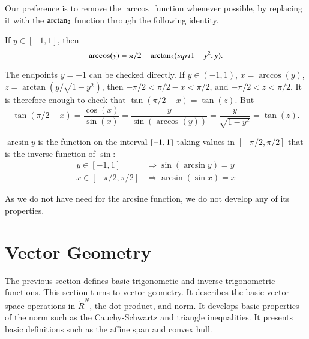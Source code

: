 Our preference is to remove the $\arccos$ function whenever
possible, by replacing it with the ${\operatorname{arctan_2}}$ function through the
following identity.  


\begin{lemma}\label{lemma:arccos-arctan}  
If $y\in [-1,1]$, then
    $$\arccos(y) = \pi/2 - {\operatorname{arctan_2}}({ sqrt{1-y^2}},{y}).$$
\end{lemma}

\begin{proved}
The endpoints $y=\pm1$ can be checked directly.
If $y\in (-1,1)$,  $x = \arccos(y)$, 
$z = \arctan(y/\sqrt{1-y^2})$, then
    $-\pi/2 < \pi/2 - x < \pi/2$, and $-\pi/2 < z < \pi/2$.  It is
    therefore enough to check that
        $\tan(\pi/2 - x) = \tan(z)$.
    But
        $$\tan(\pi/2-x) = \frac{\cos(x)}{\sin(x)} = \frac{y}{
        \sin(\arccos(y))} = \frac{y}{ \sqrt{1-y^2}} = \tan(z).$$
\swallowed\end{proved}

\begin{definition}[arcsine]\label{def:arcsin}
$\arcsin y$ is the function on the interval $[
-1,1]$ taking values in $[-\pi/2,\pi/2]$ that is the
inverse function of $\sin$:
    $$\begin{array}{lll}
        y\in [-1,1] &\Rightarrow \sin(\arcsin y) = y\\
        x\in[-\pi/2,\pi/2] &\Rightarrow \arcsin(\sin x) = x
    \end{array}$$
\end{definition}

As we do not have need for the arcsine function, we do not develop
any of its properties.





\section{Vector Geometry}

The previous section defines basic trigonometic and
inverse trigonometric functions.  This section turns
to vector geometry.  It describes the basic vector
space operations in $\ring{R}^N$, the dot product, and
norm.  It develops basic properties of the norm such
as the Cauchy-Schwartz and triangle inequalities.
It presents basic definitions such as the affine span and
convex hull.

